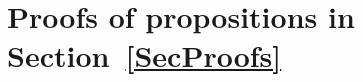 

\section{Proofs of propositions in Section~\ref{SecProofs}}
\label{AppSecProofs}

















